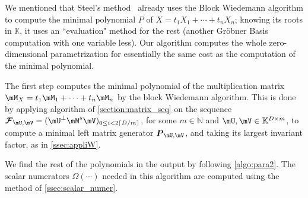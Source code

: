 \documentclass[12pt]{article}
\newcommand{\mat}[1]{\bm{\MakeUppercase{#1}}} %
\newcommand{\seq}{\mat{\mathcal{F}}} %
\newcommand{\minpoly}{P}
\newcommand{\lf}{X}
\def\K{\mathbb{K}}
\def\K {\ensuremath{\mathbb{K}}}
\begin{document}
We mentioned that Steel's method~\cite{Steel15} already uses the Block
Wiedemann algorithm to compute the minimal polynomial $\minpoly$ of
$\lf=t_1 X_1 + \cdots + t_n X_n$; knowing its roots in $\K$, it uses
an ``evaluation" method for the rest (another Gr\"obner Basis
computation with one variable less).  Our algorithm computes 
the whole zero-dimensional parametrization for essentially the same
cost as the computation of the minimal polynomial.


The first step computes the minimal polynomial of the multiplication
matrix $\mM_\lf=t_1 \mM_1 + \cdots + t_n \mM_n$ by the block Wiedemann
algorithm.  This is done by applying algorithm of
\cref{section:matrix_seq} on the sequence $\seq_{\mU,\mV}=
(\mU^{\perp}\mM^s\mV)_{0 \le i < 2 \lceil D/m \rceil}$, for some $m
\in \mathbb{N}$ and $\mU,\mV \in \mathbb{K}^{D \times m}$, to compute
a minimal left matrix generator $\mat{P}_{\mU,\mV}$, and taking its
largest invariant factor, as in \cref{ssec:appliW}.

We find the rest of the polynomials in the output by following
\cref{algo:para2}. The scalar numerators $\Omega(\cdots)$ needed in
this algorithm are computed using the method of
\cref{ssec:scalar_numer}.
\end{document}
